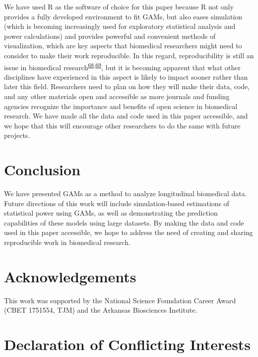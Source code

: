 \documentclass[
]{article}
\begin{document}
We have used R as the software of choice for this paper because R not only provides a fully developed environment to fit GAMs, but also eases simulation (which is becoming increasingly used for exploratory statistical analysis and power calculations) and provides powerful and convenient methods of visualization, which are key aspects that biomedical researchers might need to consider to make their work reproducible. In this regard, reproducibility is still an issue in biomedical research\textsuperscript{\protect\hyperlink{ref-begley2015}{68},\protect\hyperlink{ref-weissgerber2018}{69}}, but it is becoming apparent that what other disciplines have experienced in this aspect is likely to impact sooner rather than later this field. Researchers need to plan on how they will make their data, code, and any other materials open and accessible as more journals and funding agencies recognize the importance and benefits of open science in biomedical research. We have made all the data and code used in this paper accessible, and we hope that this will encourage other researchers to do the same with future projects.

\hypertarget{conclusion}{%
\section{Conclusion}\label{conclusion}}

We have presented GAMs as a method to analyze longitudinal biomedical data. Future directions of this work will include simulation-based estimations of statistical power using GAMs, as well as demonstrating the prediction capabilities of these models using large datasets.
By making the data and code used in this paper accessible, we hope to address the need of creating and sharing reproducible work in biomedical research.

\hypertarget{acknowledgements}{%
\section{Acknowledgements}\label{acknowledgements}}

This work was supported by the National Science Foundation Career Award (CBET 1751554, TJM) and the Arkansas Biosciences Institute.

\hypertarget{declaration-of-conflicting-interests}{%
\section{Declaration of Conflicting Interests}\label{declaration-of-conflicting-interests}}
\end{document}
